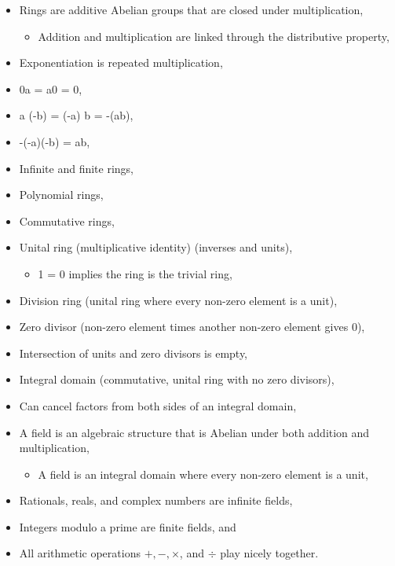 \begin{itemize}
\tightlist
\item
  Rings are additive Abelian groups that are closed under
  multiplication,

  \begin{itemize}
  \tightlist
  \item
    Addition and multiplication are linked through the distributive
    property,
  \end{itemize}
\item
  Exponentiation is repeated multiplication,
\item
  0a = a0 = 0,
\item
  a (-b) = (-a) b = -(ab),
\item
  -(-a)(-b) = ab,
\item
  Infinite and finite rings,
\item
  Polynomial rings,
\item
  Commutative rings,
\item
  Unital ring (multiplicative identity) (inverses and units),

  \begin{itemize}
  \tightlist
  \item
    1 = 0 implies the ring is the trivial ring,
  \end{itemize}
\item
  Division ring (unital ring where every non-zero element is a unit),
\item
  Zero divisor (non-zero element times another non-zero element gives
  0),
\item
  Intersection of units and zero divisors is empty,
\item
  Integral domain (commutative, unital ring with no zero divisors),
\item
  Can cancel factors from both sides of an integral domain,
\item
  A field is an algebraic structure that is Abelian under both addition
  and multiplication,

  \begin{itemize}
  \tightlist
  \item
    A field is an integral domain where every non-zero element is a
    unit,
  \end{itemize}
\item
  Rationals, reals, and complex numbers are infinite fields,
\item
  Integers modulo a prime are finite fields, and
\item
  All arithmetic operations \(+, -, \times\), and \(\div\) play nicely
  together.
\end{itemize}

